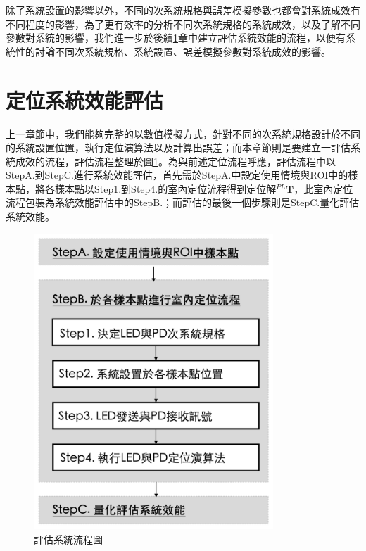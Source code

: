 除了系統設置的影響以外，不同的次系統規格與誤差模擬參數也都會對系統成效有不同程度的影響，為了更有效率的分析不同次系統規格的系統成效，以及了解不同參數對系統的影響，我們進一步於後續\ref{chp:system_evaluate}章中建立評估系統效能的流程，以便有系統性的討論不同次系統規格、系統設置、誤差模擬參數對系統成效的影響。







\newpage

\section{定位系統效能評估}
\label{chp:system_evaluate}

上一章節中，我們能夠完整的以數值模擬方式，針對不同的次系統規格設計於不同的系統設置位置，執行定位演算法以及計算出誤差；而本章節則是要建立一評估系統成效的流程，評估流程整理於圖\ref{pic:evaluate_flow}。為與前述定位流程呼應，評估流程中以StepA.到StepC.進行系統效能評估，首先需於StepA.中設定使用情境與ROI中的樣本點，將各樣本點以Step1.到Step4.的室內定位流程得到定位解$^{PL}\boldsymbol{T}$，此室內定位流程包裝為系統效能評估中的StepB.；而評估的最後一個步驟則是StepC.量化評估系統效能。


\begin{figure}[htpb]
    \centering
    \includegraphics[width=9cm]{ch4pic/evaluate_flow.png}
    \caption{評估系統流程圖}
    \label{pic:evaluate_flow}
\end{figure}


